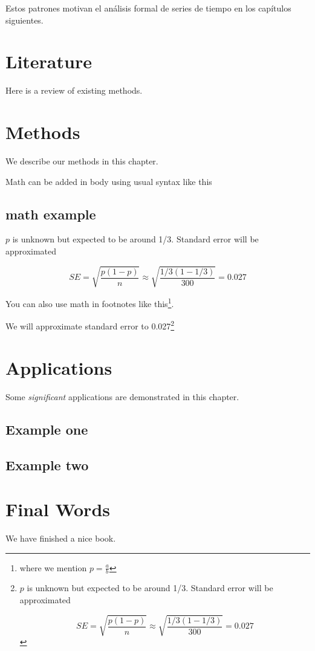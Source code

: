 \documentclass[
]{book}
\begin{document}
Estos patrones motivan el análisis formal de series de tiempo en los capítulos siguientes.

\chapter{Literature}\label{literature}

Here is a review of existing methods.

\chapter{Methods}\label{methods}

We describe our methods in this chapter.

Math can be added in body using usual syntax like this

\section{math example}\label{math-example}

\(p\) is unknown but expected to be around 1/3. Standard error will be approximated

\[
SE = \sqrt{\frac{p(1-p)}{n}} \approx \sqrt{\frac{1/3 (1 - 1/3)} {300}} = 0.027
\]

You can also use math in footnotes like this\footnote{where we mention \(p = \frac{a}{b}\)}.

We will approximate standard error to 0.027\footnote{\(p\) is unknown but expected to be around 1/3. Standard error will be approximated

  \[
  SE = \sqrt{\frac{p(1-p)}{n}} \approx \sqrt{\frac{1/3 (1 - 1/3)} {300}} = 0.027
  \]}

\chapter{Applications}\label{applications}

Some \emph{significant} applications are demonstrated in this chapter.

\section{Example one}\label{example-one}

\section{Example two}\label{example-two}

\chapter{Final Words}\label{final-words}

We have finished a nice book.

  
\end{document}
